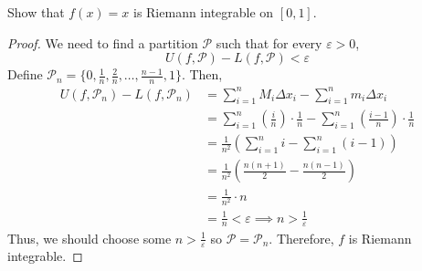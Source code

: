 \begin{theorem}
    Show that $f(x) = x$ is Riemann integrable on $[0, 1]$.
\end{theorem}
\begin{proof}
    We need to find a partition $\mathcal{P}$ such that for every $\varepsilon > 0$, $$U(f, \mathcal{P}) - L(f, \mathcal{P}) < \varepsilon$$
    Define $\mathcal{P}_n = \{0, \frac{1}{n}, \frac{2}{n}, \ldots, \frac{n - 1}{n}, 1\}$. Then,
    \begin{align*}
        U(f, \mathcal{P}_n) - L(f, \mathcal{P}_n) &= \sum_{i=1}^n M_i \Delta x_i - \sum_{i=1}^n m_i \Delta x_i \\
        &= \sum_{i=1}^n \left(\frac{i}{n}\right) \cdot \frac{1}{n} - \sum_{i=1}^n \left(\frac{i - 1}{n}\right) \cdot \frac{1}{n} \\
        &= \frac{1}{n^2} \left(\sum_{i=1}^n i - \sum_{i=1}^n (i - 1)\right) \\
        &= \frac{1}{n^2} \left(\frac{n(n + 1)}{2} - \frac{n(n - 1)}{2}\right) \\
        &= \frac{1}{n^2} \cdot n \\
        &= \frac{1}{n} < \varepsilon \implies n > \frac{1}{\varepsilon}
    \end{align*}
    Thus, we should choose some $n > \frac{1}{\varepsilon}$ so $\mathcal{P} = \mathcal{P}_n$. Therefore, $f$ is Riemann integrable.
\end{proof}